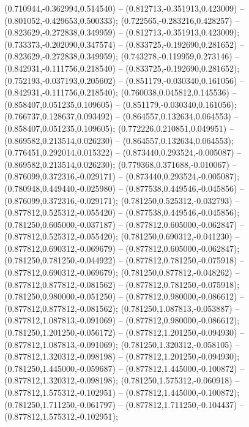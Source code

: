  (0.710944,-0.362994,0.514540) -- (0.812713,-0.351913,0.423009) -- (0.801052,-0.429653,0.500333);
 (0.722565,-0.283216,0.428257) -- (0.823629,-0.272838,0.349959) -- (0.812713,-0.351913,0.423009);
 (0.733373,-0.202090,0.347574) -- (0.833725,-0.192690,0.281652) -- (0.823629,-0.272838,0.349959);
 (0.743278,-0.119959,0.273146) -- (0.842931,-0.111756,0.218540) -- (0.833725,-0.192690,0.281652);
 (0.752193,-0.037193,0.205602) -- (0.851179,-0.030340,0.161056) -- (0.842931,-0.111756,0.218540);
 (0.760038,0.045812,0.145536) -- (0.858407,0.051235,0.109605) -- (0.851179,-0.030340,0.161056);
 (0.766737,0.128637,0.093492) -- (0.864557,0.132634,0.064553) -- (0.858407,0.051235,0.109605);
 (0.772226,0.210851,0.049951) -- (0.869582,0.213514,0.026230) -- (0.864557,0.132634,0.064553);
 (0.776451,0.292014,0.015322) -- (0.873440,0.293524,-0.005087) -- (0.869582,0.213514,0.026230);
 (0.779368,0.371688,-0.010067) -- (0.876099,0.372316,-0.029171) -- (0.873440,0.293524,-0.005087);
 (0.780948,0.449440,-0.025980) -- (0.877538,0.449546,-0.045856) -- (0.876099,0.372316,-0.029171);
 (0.781250,0.525312,-0.032793) -- (0.877812,0.525312,-0.055420) -- (0.877538,0.449546,-0.045856);
 (0.781250,0.605000,-0.037187) -- (0.877812,0.605000,-0.062847) -- (0.877812,0.525312,-0.055420);
 (0.781250,0.690312,-0.041230) -- (0.877812,0.690312,-0.069679) -- (0.877812,0.605000,-0.062847);
 (0.781250,0.781250,-0.044922) -- (0.877812,0.781250,-0.075918) -- (0.877812,0.690312,-0.069679);
 (0.781250,0.877812,-0.048262) -- (0.877812,0.877812,-0.081562) -- (0.877812,0.781250,-0.075918);
 (0.781250,0.980000,-0.051250) -- (0.877812,0.980000,-0.086612) -- (0.877812,0.877812,-0.081562);
 (0.781250,1.087813,-0.053887) -- (0.877812,1.087813,-0.091069) -- (0.877812,0.980000,-0.086612);
 (0.781250,1.201250,-0.056172) -- (0.877812,1.201250,-0.094930) -- (0.877812,1.087813,-0.091069);
 (0.781250,1.320312,-0.058105) -- (0.877812,1.320312,-0.098198) -- (0.877812,1.201250,-0.094930);
 (0.781250,1.445000,-0.059687) -- (0.877812,1.445000,-0.100872) -- (0.877812,1.320312,-0.098198);
 (0.781250,1.575312,-0.060918) -- (0.877812,1.575312,-0.102951) -- (0.877812,1.445000,-0.100872);
 (0.781250,1.711250,-0.061797) -- (0.877812,1.711250,-0.104437) -- (0.877812,1.575312,-0.102951);

